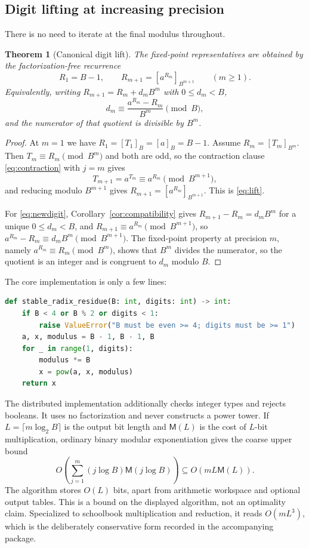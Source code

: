 \documentclass[11pt,letterpaper]{article}
\numberwithin{equation}{section}
\newtheorem{theorem}{Theorem}[section]
\theoremstyle{definition}
\theoremstyle{remark}
\newcommand{\res}[2]{\left[#1\right]_{#2}}
\begin{document}
\subsection{Digit lifting at increasing precision}\label{sec:lifting}

There is no need to iterate at the final modulus throughout.

\begin{theorem}[Canonical digit lift]\label{thm:lift}
The fixed-point representatives are obtained by the factorization-free recurrence
\begin{equation}\label{eq:lift}
 R_1=B-1,\qquad R_{m+1}=\res{a^{R_m}}{B^{m+1}}\qquad(m\ge1).
\end{equation}
Equivalently, writing $R_{m+1}=R_m+d_mB^m$ with $0\le d_m<B$,
\begin{equation}\label{eq:newdigit}
 d_m\equiv\frac{a^{R_m}-R_m}{B^m}\pmod B,
\end{equation}
and the numerator of that quotient is divisible by $B^m$.
\end{theorem}
\begin{proof}
At $m=1$ we have $R_1=\res{T_1}{B}=\res{a}{B}=B-1$. Assume $R_m=\res{T_m}{B^m}$. Then $T_m\equiv R_m\pmod{B^m}$ and both are odd, so the contraction clause \eqref{eq:contraction} with $j=m$ gives
\[
 T_{m+1}=a^{T_m}\equiv a^{R_m}\pmod{B^{m+1}},
\]
and reducing modulo $B^{m+1}$ gives $R_{m+1}=\res{a^{R_m}}{B^{m+1}}$. This is \eqref{eq:lift}.

For \eqref{eq:newdigit}, Corollary~\ref{cor:compatibility} gives $R_{m+1}-R_m=d_mB^m$ for a unique $0\le d_m<B$, and $R_{m+1}\equiv a^{R_m}\pmod{B^{m+1}}$, so $a^{R_m}-R_m\equiv d_mB^m\pmod{B^{m+1}}$. The fixed-point property at precision $m$, namely $a^{R_m}\equiv R_m\pmod{B^m}$, shows that $B^m$ divides the numerator, so the quotient is an integer and is congruent to $d_m$ modulo $B$.
\end{proof}

The core implementation is only a few lines:
\begin{lstlisting}[language=Python]
def stable_radix_residue(B: int, digits: int) -> int:
    if B < 4 or B % 2 or digits < 1:
        raise ValueError("B must be even >= 4; digits must be >= 1")
    a, x, modulus = B - 1, B - 1, B
    for _ in range(1, digits):
        modulus *= B
        x = pow(a, x, modulus)
    return x
\end{lstlisting}
The distributed implementation additionally checks integer types and rejects booleans. It uses no factorization and never constructs a power tower. If $L=\lceil m\log_2B\rceil$ is the output bit length and $\mathsf M(L)$ is the cost of $L$-bit multiplication, ordinary binary modular exponentiation gives the coarse upper bound
\[
 O\!\left(\sum_{j=1}^m (j\log B)\mathsf M(j\log B)\right)
 \subseteq O(mL\mathsf M(L)).
\]
The algorithm stores $O(L)$ bits, apart from arithmetic workspace and optional output tables. This is a bound on the displayed algorithm, not an optimality claim. Specialized to schoolbook multiplication and reduction, it reads $O(mL^3)$, which is the deliberately conservative form recorded in the accompanying package.
\end{document}
